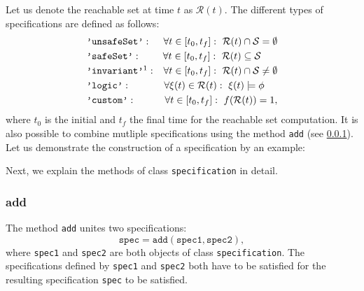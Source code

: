 Let us denote the reachable set at time $t$ as $\mathcal{R}(t)$. The different types of specifications are defined as follows:
\begin{align*}
	&\texttt{'unsafeSet'}: &\forall t \in [t_0,t_f]: ~ \mathcal{R}(t) \cap \mathcal{S} = \emptyset \\
	&\texttt{'safeSet'}: &\forall t \in [t_0,t_f]: ~ \mathcal{R}(t) \subseteq \mathcal{S} ~~~~~\\
	&\texttt{'invariant'}\footnotemark: &\forall t \in [t_0,t_f]: ~ \mathcal{R}(t) \cap \mathcal{S} \neq \emptyset \\
	&\texttt{'logic'}: &\forall \xi(t) \in \mathcal{R}(t): ~ \xi(t) \models \phi ~~~~\\
	&\texttt{'custom'}: &\forall t \in [t_0,t_f]: ~ f(\mathcal{R}(t)) = 1,
\end{align*}
%
where $t_0$ is the initial and $t_f$ the final time for the reachable set computation. It is also possible to combine mutliple specifications using the method \texttt{add} (see \cref{sec:specAdd}). Let us demonstrate the construction of a specification by an example:

\begin{center}
\begin{minipage}[t]{0.55\textwidth}
	\vspace{10pt}
	\footnotesize
	
\end{minipage}
\begin{minipage}[t]{0.3\textwidth}
	\vspace{0pt}
	\centering
\end{minipage}
\end{center}

Next, we explain the methods of class \texttt{specification} in detail.

\subsubsection{add}
\label{sec:specAdd}

The method \texttt{add} unites two specifications:
\begin{equation*}
	\texttt{spec} = \texttt{add}(\texttt{spec1},\texttt{spec2}),
\end{equation*}
where \texttt{spec1} and \texttt{spec2} are both objects of class \texttt{specification}. The specifications defined by \texttt{spec1} and \texttt{spec2} both have to be satisfied for the resulting specification \texttt{spec} to be satisfied.

